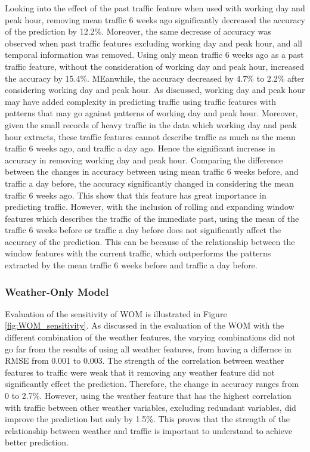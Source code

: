 Looking into the effect of the past traffic feature when used with working day and peak hour, removing mean traffic 6 weeks ago significantly decreased the accuracy of the prediction by 12.2\%. Moreover, the same decrease of accuracy was observed when past traffic features excluding working day and peak hour, and all temporal information was removed. Using only mean traffic 6 weeks ago as a past traffic feature, without the consideration of working day and peak hour, increased the accuracy by 15.4\%. MEanwhile, the accuracy decreased by 4.7\% to 2.2\% after considering working day and peak hour. As discussed, working day and peak hour may have added complexity in predicting traffic using traffic features with patterns that may go against patterns of working day and peak hour. Moreover, given the small records of heavy traffic in the data which working day and peak hour extracts, these traffic features cannot describe traffic as much as the mean traffic 6 weeks ago, and traffic a day ago. Hence the significant increase in accuracy in removing working day and peak hour. Comparing the difference between the changes in accuracy between using mean traffic 6 weeks before, and traffic a day before, the accuracy significantly changed in considering the mean traffic 6 weeks ago. This show that this feature has great importance in predicting traffic. However, with the inclusion of rolling and expanding window features which describes the traffic of the immediate past, using the mean of the traffic 6 weeks before or traffic a day before does not significantly affect the accuracy of the prediction. This can be because of the relationship between the window features with the current traffic, which outperforms the patterns extracted by the mean traffic 6 weeks before and traffic a day before. 


\subsubsection{Weather-Only Model}
Evaluation of the sensitivity of WOM is illustrated in Figure \ref{fig:WOM_sensitivity}. As discussed in the evaluation of the WOM with the different combination of the weather features, the varying combinations did not go far from the results of using all weather features, from having a differnce in RMSE from 0.001 to 0.003. The strength of the correlation between weather features to traffic were weak that it removing any weather feature did not significantly effect the prediction. Therefore, the change in accuracy ranges from 0 to 2.7\%. However, using the weather feature that has the highest correlation with traffic between other weather variables, excluding redundant variables, did improve the prediction but only by 1.5\%. This proves that the strength of the relationship between weather and traffic is important to understand to achieve better prediction. 

